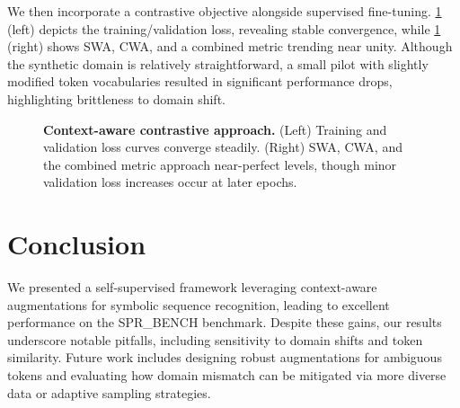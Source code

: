 \documentclass{article} %
\theoremstyle{plain}
\theoremstyle{definition}
\theoremstyle{remark}
\begin{document}
We then incorporate a contrastive objective alongside supervised fine-tuning. \cref{fig:joint_figs} (left) depicts the training/validation loss, revealing stable convergence, while \cref{fig:joint_figs} (right) shows SWA, CWA, and a combined metric trending near unity. Although the synthetic domain is relatively straightforward, a small pilot with slightly modified token vocabularies resulted in significant performance drops, highlighting brittleness to domain shift.

\begin{figure}[t!]
\centering
{}
\hspace{0.02\textwidth}
\caption{\textbf{Context-aware contrastive approach.} (Left) Training and validation loss curves converge steadily. (Right) SWA, CWA, and the combined metric approach near-perfect levels, though minor validation loss increases occur at later epochs.}
\label{fig:joint_figs}
\end{figure}

\section{Conclusion}
We presented a self-supervised framework leveraging context-aware augmentations for symbolic sequence recognition, leading to excellent performance on the SPR\_BENCH benchmark. Despite these gains, our results underscore notable pitfalls, including sensitivity to domain shifts and token similarity. Future work includes designing robust augmentations for ambiguous tokens and evaluating how domain mismatch can be mitigated via more diverse data or adaptive sampling strategies.
\end{document}
